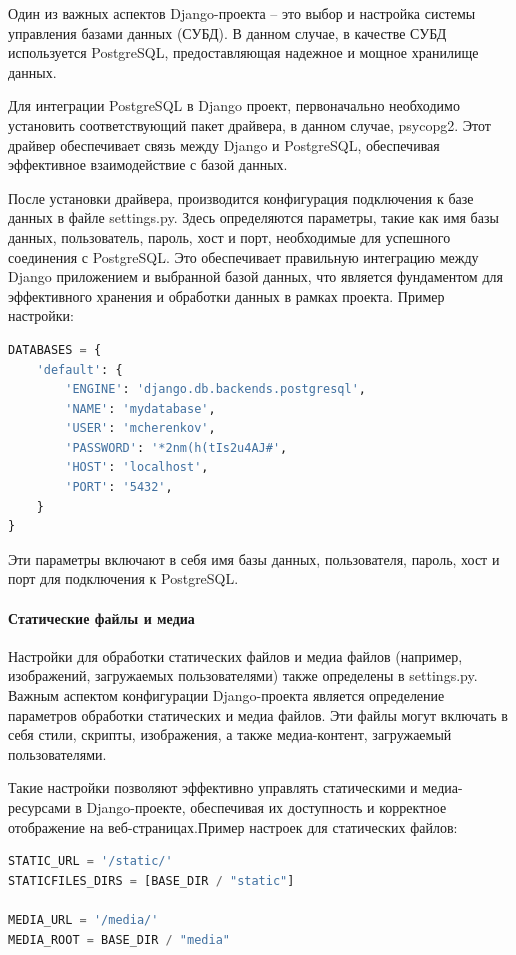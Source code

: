 Один из важных аспектов Django-проекта – это выбор и настройка системы управления базами данных (СУБД). В данном случае, в качестве СУБД используется PostgreSQL, предоставляющая надежное и мощное хранилище данных.

Для интеграции PostgreSQL в Django проект, первоначально необходимо установить соответствующий пакет драйвера, в данном случае, psycopg2. Этот драйвер обеспечивает связь между Django и PostgreSQL, обеспечивая эффективное взаимодействие с базой данных.

После установки драйвера, производится конфигурация подключения к базе данных в файле settings.py. Здесь определяются параметры, такие как имя базы данных, пользователь, пароль, хост и порт, необходимые для успешного соединения с PostgreSQL. Это обеспечивает правильную интеграцию между Django приложением и выбранной базой данных, что является фундаментом для эффективного хранения и обработки данных в рамках проекта. Пример настройки:

 
\begin{lstlisting}[language=Python]
DATABASES = {
	'default': {
		'ENGINE': 'django.db.backends.postgresql',
		'NAME': 'mydatabase',
		'USER': 'mcherenkov',
		'PASSWORD': '*2nm(h(tIs2u4AJ#',
		'HOST': 'localhost',
		'PORT': '5432',
	}
}
\end{lstlisting}  
 
Эти параметры включают в себя имя базы данных, пользователя, пароль, хост и порт для подключения к PostgreSQL.

\paragraph{Статические файлы и медиа}

Настройки для обработки статических файлов и медиа файлов (например, изображений, загружаемых пользователями) также определены в settings.py. Важным аспектом конфигурации Django-проекта является определение параметров обработки статических и медиа файлов. Эти файлы могут включать в себя стили, скрипты, изображения, а также медиа-контент, загружаемый пользователями.
 
Такие настройки позволяют эффективно управлять статическими и медиа-ресурсами в Django-проекте, обеспечивая их доступность и корректное отображение на веб-страницах.Пример настроек для статических файлов:
 
\begin{lstlisting}[language=Python]
STATIC_URL = '/static/'
STATICFILES_DIRS = [BASE_DIR / "static"]

MEDIA_URL = '/media/'
MEDIA_ROOT = BASE_DIR / "media"

\end{lstlisting}  

